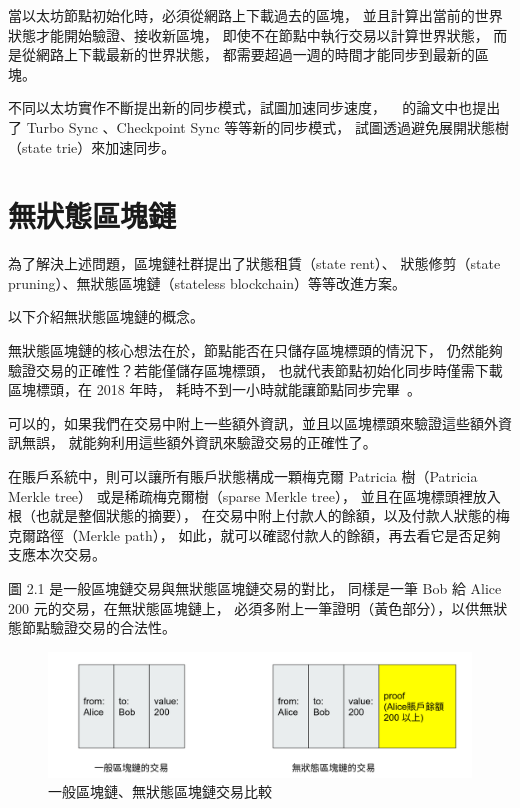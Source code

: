 當以太坊節點初始化時，必須從網路上下載過去的區塊，
並且計算出當前的世界狀態才能開始驗證、接收新區塊，
即使不在節點中執行交易以計算世界狀態，
而是從網路上下載最新的世界狀態，
都需要超過一週的時間才能同步到最新的區塊。

不同以太坊實作不斷提出新的同步模式，試圖加速同步速度，
~\cite{qian2018improved} 的論文中也提出了
Turbo Sync 、Checkpoint Sync 等等新的同步模式，
試圖透過避免展開狀態樹（state trie）來加速同步。

\section{無狀態區塊鏈}
為了解決上述問題，區塊鏈社群提出了狀態租賃（state rent）、
狀態修剪（state pruning）、無狀態區塊鏈（stateless blockchain）等等改進方案。

以下介紹無狀態區塊鏈的概念。

無狀態區塊鏈的核心想法在於，節點能否在只儲存區塊標頭的情況下，
仍然能夠驗證交易的正確性？若能僅儲存區塊標頭，
也就代表節點初始化同步時僅需下載區塊標頭，在 2018 年時，
耗時不到一小時就能讓節點同步完畢~\cite{qian2018improved}。

可以的，如果我們在交易中附上一些額外資訊，並且以區塊標頭來驗證這些額外資訊無誤，
就能夠利用這些額外資訊來驗證交易的正確性了。

在賬戶系統中，則可以讓所有賬戶狀態構成一顆梅克爾 Patricia 樹（Patricia Merkle tree）
或是稀疏梅克爾樹（sparse Merkle tree）\cite{dahlberg2016efficient}，
並且在區塊標頭裡放入根（也就是整個狀態的摘要），
在交易中附上付款人的餘額，以及付款人狀態的梅克爾路徑（Merkle path），
如此，就可以確認付款人的餘額，再去看它是否足夠支應本次交易。

圖 2.1 是一般區塊鏈交易與無狀態區塊鏈交易的對比，
同樣是一筆 Bob 給 Alice 200 元的交易，在無狀態區塊鏈上，
必須多附上一筆證明（黃色部分），以供無狀態節點驗證交易的合法性。

\begin{figure}
\centerline{\includegraphics[width=\textwidth]{stateless-tx}}
\caption{一般區塊鏈、無狀態區塊鏈交易比較}
\end{figure}

